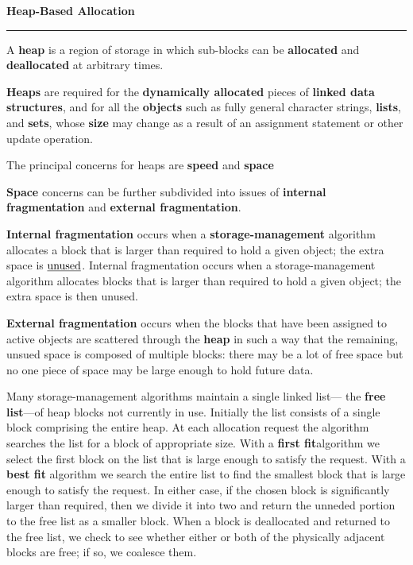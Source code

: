 \nopagenumbers
{\bf Heap-Based Allocation}
\vskip 1mm
\hrule

\vskip 6pt
A {\bf heap} is a region of storage in which sub-blocks can be {\bf allocated} and {\bf deallocated} at arbitrary times.

\vskip 6pt
{\bf Heaps} are required for the {\bf dynamically allocated} pieces of {\bf linked data structures}, and for all the {\bf objects} such as fully general character strings, {\bf lists}, and {\bf sets}, whose {\bf size} may change as a result of an assignment statement or other update operation.

The principal concerns for heaps are {\bf speed} and {\bf space}

\vskip 6pt
{\bf Space} concerns can be further subdivided into issues of {\bf internal fragmentation} and {\bf external fragmentation}.

\vskip 6pt
{\bf Internal fragmentation} occurs when a {\bf storage-management} algorithm allocates a block that is larger than required to hold a given object; the extra space is $\underline{\hbox{unused}}$. Internal  fragmentation occurs when a storage-management algorithm allocates blocks that is larger than required to hold a given object; the extra space is then unused.

\vskip 6pt
{\bf External fragmentation} occurs when the blocks that have been assigned to active objects are scattered through the {\bf heap} in such a way that the remaining, unsued space is composed of multiple blocks: there may be a lot of free space but no one piece of space may be large enough to hold future data.

\vskip 6pt
Many storage-management algorithms maintain a single linked list--- the {\bf free list}---of heap blocks not currently in use. Initially the list consists of a single block comprising the entire heap. At each allocation request the algorithm searches the list for a block of appropriate size. With a {\bf first fit}algorithm we select the first block on the list that is large enough to satisfy the request. With a {\bf best fit} algorithm we search the entire list to find the smallest block that is large enough to satisfy the request. In either case, if the chosen block is significantly larger than required, then we divide it into two and return the unneded portion to the free list as a smaller block. When a block is deallocated and returned to the free list, we check to see whether either or both of the physically adjacent blocks are free; if so, we coalesce them.

